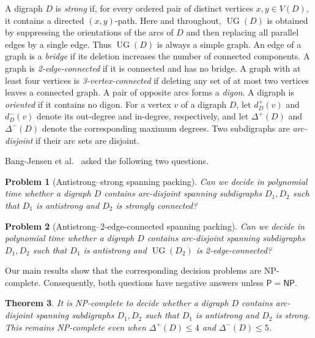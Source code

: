 \documentclass[12pt]{article}
\newtheorem{theorem}{Theorem}
\newtheorem{problem}[theorem]{Problem}
\theoremstyle{remark}
\newcommand{\UG}{\operatorname{UG}}
\begin{document}
A digraph $D$ is \emph{strong} if, for every ordered pair of distinct vertices $x,y\in V(D)$, it contains a directed
$(x,y)$-path. Here and throughout, $\UG(D)$ is obtained by suppressing the
orientations of the arcs of $D$ and then replacing all parallel
edges by a single edge.  Thus $\UG(D)$ is always a simple graph.
An edge of a graph is a \emph{bridge} if its deletion increases the number of connected components.  A graph is \emph{2-edge-connected} if it is connected and has no bridge.
A graph with at least four vertices is \emph{3-vertex-connected} if deleting any set of at most two vertices leaves a connected graph. A pair of opposite arcs forms a \emph{digon}.  A digraph is
\emph{oriented} if it contains no digon.
For a vertex $v$ of a digraph $D$, let $d_D^+(v)$ and $d_D^-(v)$ denote its out-degree and in-degree, respectively, and let $\Delta^+(D)$ and $\Delta^-(D)$ denote the corresponding maximum
degrees.
Two subdigraphs are \emph{arc-disjoint} if their arc
sets are disjoint. 


Bang-Jensen et al.~\cite[Questions~9.1 and~9.2]{BBJK} asked the following two questions.

\begin{problem}[Antistrong--strong spanning packing]
\label{prob:AS-SC}
Can we decide in polynomial time whether a digraph $D$ contains arc-disjoint spanning
subdigraphs $D_1,D_2$ such that $D_1$ is antistrong and $D_2$ is strongly connected?
\end{problem}

\begin{problem}[Antistrong--2-edge-connected spanning packing]
\label{prob:AS-2EC}
Can we decide in polynomial time whether a digraph $D$ contains arc-disjoint spanning
subdigraphs $D_1,D_2$ such that $D_1$ is antistrong and
$\UG(D_2)$ is 2-edge-connected?
\end{problem}





Our main results show that the corresponding decision problems are NP-complete.  Consequently, both questions have negative answers
unless $\mathsf{P}=\mathsf{NP}$.

\begin{theorem}\label{thm:main-SC}
It is NP-complete to decide whether a digraph $D$ contains
arc-disjoint spanning subdigraphs $D_1,D_2$ such that $D_1$ is antistrong and $D_2$ is strong. This remains NP-complete even when
$\Delta^+(D)\le 4$ and $\Delta^-(D)\le 5$.
\end{theorem}
\end{document}
